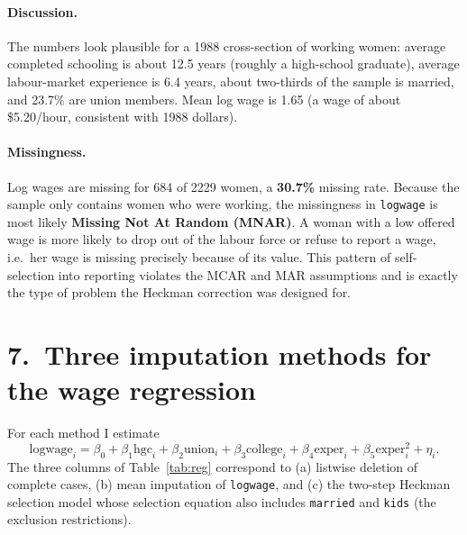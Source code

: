 \documentclass[11pt]{article}
\begin{document}
\paragraph{Discussion.}  The numbers look plausible for a 1988 cross-section
of working women: average completed schooling is about 12.5 years (roughly a
high-school graduate), average labour-market experience is 6.4 years, about
two-thirds of the sample is married, and 23.7\% are union members.  Mean log
wage is 1.65 (a wage of about \$5.20/hour, consistent with 1988 dollars).

\paragraph{Missingness.}  Log wages are missing for 684 of 2229 women, a
\textbf{30.7\%} missing rate.  Because the sample only contains women who
were working, the missingness in \texttt{logwage} is most likely
\textbf{Missing Not At Random (MNAR)}.  A woman with a low offered wage is
more likely to drop out of the labour force or refuse to report a wage,
i.e.\ her wage is missing precisely because of its value.  This pattern of
self-selection into reporting violates the MCAR and MAR assumptions and is
exactly the type of problem the Heckman correction was designed for.

\section*{7.\ Three imputation methods for the wage regression}
For each method I estimate
\[
\text{logwage}_i = \beta_0 + \beta_1 \text{hgc}_i + \beta_2 \text{union}_i +
                   \beta_3 \text{college}_i + \beta_4 \text{exper}_i +
                   \beta_5 \text{exper}_i^2 + \eta_i.
\]
The three columns of Table~\ref{tab:reg} correspond to (a) listwise deletion
of complete cases, (b) mean imputation of \texttt{logwage}, and (c) the
two-step Heckman selection model whose selection equation also includes
\texttt{married} and \texttt{kids} (the exclusion restrictions).
\end{document}
